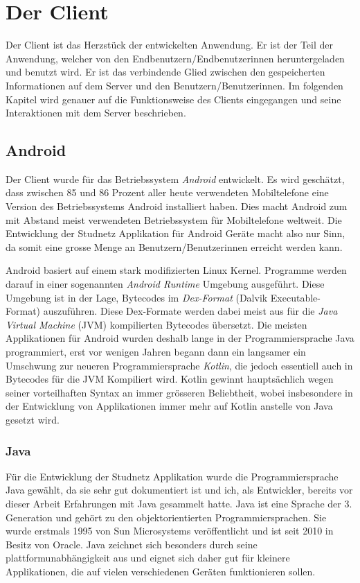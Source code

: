 \documentclass[../main.tex]{subfiles}
\begin{document}
	\chapter{Der Client}
	Der Client ist das Herzstück der entwickelten Anwendung. Er ist der Teil der Anwendung, welcher von den Endbenutzern/Endbenutzerinnen heruntergeladen und benutzt wird. Er ist das verbindende Glied zwischen den gespeicherten Informationen auf dem Server und den Benutzern/Benutzerinnen. Im folgenden Kapitel wird genauer auf die Funktionsweise des Clients eingegangen und seine Interaktionen mit dem Server beschrieben.
	
	\section{Android}
	Der Client wurde für das Betriebssystem \emph{Android} entwickelt. Es wird geschätzt, dass zwischen 85 und 86 Prozent aller heute verwendeten Mobiltelefone eine Version des Betriebssystems Android installiert haben. Dies macht Android zum mit Abstand meist verwendeten Betriebssystem für Mobiltelefone weltweit. Die Entwicklung der Studnetz Applikation für Android Geräte macht also nur Sinn, da somit eine grosse Menge an Benutzern/Benutzerinnen erreicht werden kann. \cite{android}
	
	Android basiert auf einem stark modifizierten Linux Kernel. Programme werden darauf in einer sogenannten \emph{Android Runtime} Umgebung ausgeführt. Diese Umgebung ist in der Lage, Bytecodes \cite{bytecode} im \emph{Dex-Format} (Dalvik Executable-Format) auszuführen. Diese Dex-Formate werden dabei meist aus für die \emph{Java Virtual Machine} (JVM) kompilierten Bytecodes übersetzt. Die meisten Applikationen für Android wurden deshalb lange in der Programmiersprache Java programmiert, erst vor wenigen Jahren begann dann ein langsamer ein Umschwung zur neueren Programmiersprache \emph{Kotlin}, die jedoch essentiell auch in Bytecodes für die JVM Kompiliert wird. Kotlin gewinnt hauptsächlich wegen seiner vorteilhaften Syntax an immer grösseren Beliebtheit, wobei insbesondere in der Entwicklung von Applikationen immer mehr auf Kotlin anstelle von Java gesetzt wird. \cite{androidJava}
	
	\subsection{Java}
	Für die Entwicklung der Studnetz Applikation wurde die Programmiersprache Java gewählt, da sie sehr gut dokumentiert ist und ich, als Entwickler, bereits vor dieser Arbeit Erfahrungen mit Java gesammelt hatte. Java ist eine Sprache der 3. Generation und gehört zu den objektorientierten Programmiersprachen. Sie wurde erstmals 1995 von Sun Microsystems veröffentlicht und ist seit 2010 in Besitz von Oracle. Java zeichnet sich besonders durch seine plattformunabhängigkeit aus und eignet sich daher gut für kleinere Applikationen, die auf vielen verschiedenen Geräten funktionieren sollen.
	
\end{document}
